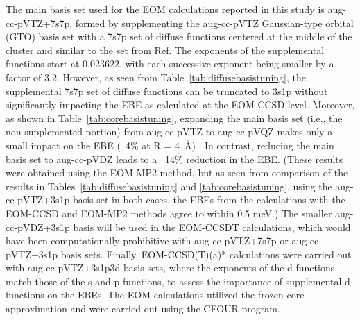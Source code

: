 The main basis set used for the EOM calculations reported in this study is aug-cc-pVTZ+7s7p, formed by supplementing the aug-cc-pVTZ Gaussian-type orbital (GTO) basis set\cite{cc-pVDTQZ,aug_for_cc-pVDTQZ} with a 7s7p set of diffuse functions centered at the middle of the cluster and similar to the set from Ref.%
The exponents of the supplemental functions start at 0.023622, with each successive exponent being smaller by a factor of 3.2. 
However, as seen from Table~\ref{tab:diffusebasistuning}, the supplemental 7s7p set of diffuse functions can be truncated to 3s1p without significantly impacting the EBE as calculated at the EOM-CCSD level.
Moreover, as shown in Table~\ref{tab:corebasistuning}, expanding the main basis set (i.e., the non-supplemented portion) from aug-cc-pVTZ to aug-cc-pVQZ\cite{cc-pVDTQZ,aug_for_cc-pVDTQZ} makes only a small impact on the EBE (~4\% at R = \SI{4}{\angstrom}) .
In contrast, reducing the main basis set to aug-cc-pVDZ\cite{cc-pVDTQZ,aug_for_cc-pVDTQZ} leads to a ~14\% reduction in the EBE.
(These results were obtained using the EOM-MP2 method, but as seen from comparison of the results in Tables~\ref{tab:diffusebasistuning} and \ref{tab:corebasistuning}, using the aug-cc-pVTZ+3s1p basis set in both cases, the EBEs from the calculations with the EOM-CCSD and EOM-MP2 methods agree to within 0.5 meV.)
The smaller aug-cc-pVDZ+3s1p basis will be used in the EOM-CCSDT calculations, which would have been computationally prohibitive with aug-cc-pVTZ+7s7p or aug-cc-pVTZ+3s1p basis sets.
Finally, EOM-CCSD(T)(a)* calculations were carried out with aug-cc-pVTZ+3s1p3d basis sets, where the exponents of the d functions match those of the s and p functions, to assess the importance of supplemental d functions on the EBEs.
The EOM calculations utilized the frozen core approximation and were carried out using the CFOUR program.\cite{cfour_1,cfour_2}
